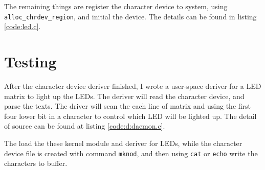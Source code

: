 \documentclass{report}
\begin{document}
    The remaining things are register the character device to system, using
    \lstinline|alloc_chrdev_region|, and initial the device. The details can be found in listing \ref{code:led.c}.
    
    \section{Testing}
    \label{chap:scd:test}
    
    After the character device deriver finished, I wrote a user-space deriver for a LED matrix to
    light up the LEDs.
    The deriver will read the character device, and parse the texts.
    The driver will scan the each line of matrix and using the first four lower bit in a character to control which LED will be lighted up. The detail of source can be found at listing \ref{code:d:daemon.c}.
    
    The load the these kernel module and deriver for LEDs, while the character device file 
    is created with command \lstinline|mknod|, and then using \lstinline|cat| or 
    \lstinline|echo| write the characters to buffer.
    
    
    
\end{document}
